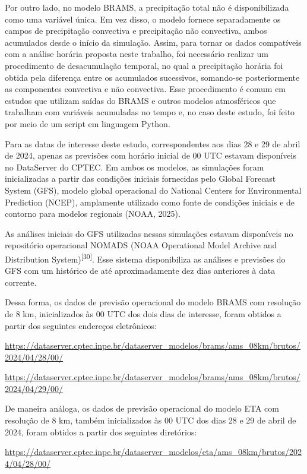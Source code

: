 \documentclass[12pt,a4paper,oneside]{book}
\begin{document}
Por outro lado, no modelo BRAMS, a precipitação total não é disponibilizada como uma variável única. Em vez disso, o modelo fornece separadamente os campos de precipitação convectiva e precipitação não convectiva, ambos acumulados desde o início da simulação. Assim, para tornar os dados compatíveis com a análise horária proposta neste trabalho, foi necessário realizar um procedimento de desacumulação temporal, no qual a precipitação horária foi obtida pela diferença entre os acumulados sucessivos, somando-se posteriormente as componentes convectiva e não convectiva. Esse procedimento é comum em estudos que utilizam saídas do BRAMS e outros modelos atmosféricos que trabalham com variáveis acumuladas no tempo e, no caso deste estudo, foi feito por meio de um script em linguagem Python.

Para as datas de interesse deste estudo, correspondentes aos dias 28 e 29 de abril de 2024, apenas as previsões com horário inicial de 00 UTC estavam disponíveis no DataServer do CPTEC. Em ambos os modelos, as simulações foram inicializadas a partir das condições iniciais fornecidas pelo Global Forecast System (GFS), modelo global operacional do National Centers for Environmental Prediction (NCEP), amplamente utilizado como fonte de condições iniciais e de contorno para modelos regionais (NOAA, 2025).

As análises iniciais do GFS utilizadas nessas simulações estavam disponíveis no repositório operacional NOMADS (NOAA Operational Model Archive and Distribution System)\textsuperscript{{[}30{]}}. Esse sistema disponibiliza as análises e previsões do GFS com um histórico de até aproximadamente dez dias anteriores à data corrente.

Dessa forma, os dados de previsão operacional do modelo BRAMS com resolução de 8 km, inicializados às 00 UTC dos dois dias de interesse, foram obtidos a partir dos seguintes endereços eletrônicos:

\url{https://dataserver.cptec.inpe.br/dataserver_modelos/brams/ams_08km/brutos/2024/04/28/00/}

\url{https://dataserver.cptec.inpe.br/dataserver_modelos/brams/ams_08km/brutos/2024/04/29/00/}

De maneira análoga, os dados de previsão operacional do modelo ETA com resolução de 8 km, também inicializados às 00 UTC dos dias 28 e 29 de abril de 2024, foram obtidos a partir dos seguintes diretórios:

\url{https://dataserver.cptec.inpe.br/dataserver\_modelos/eta/ams\_08km/brutos/2024/04/28/00/}
\end{document}
